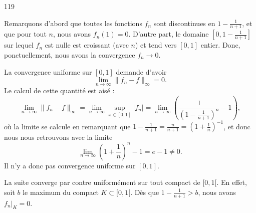 

\begin{corrige}{119}


%

Remarquons d'abord que toutes les fonctions $f_{n}$ sont discontinues en $1-\frac{1}{ n+1 }$, et que pour tout $n$, nous avons $f_n(1)=0$. D'autre part, le domaine $[0,1-\frac{1}{ n+1 }]$ sur lequel $f_n$ est nulle est croissant (avec $n$) et tend vers $[0,1]$ entier. Donc, ponctuellement, nous avons la convergence $f_n\to 0$.

La convergence uniforme sur $[0,1]$ demande d'avoir
\begin{equation}
	\lim_{n\to\infty}\| f_n-f \|_{\infty}=0.
\end{equation}
Le calcul de cette quantité est aisé :
\begin{equation}
	\lim_{n\to\infty}\| f_n-f \|_{\infty}=\lim_{n\to\infty}\sup_{x\in[0,1]}| f_n |=\lim_{n\to\infty}\left( \frac{1}{ \left( 1-\frac{ 1 }{ n+1 } \right)^n }-1 \right),
\end{equation}
où la limite se calcule en remarquant que $1-\frac{ 1 }{ n+1 }=\frac{ n }{ n+1 }=\left( 1+\frac{ 1 }{ n }\right)^{-1}$, et donc nous nous retrouvons avec la limite
\begin{equation}
	\lim_{n\to\infty}\left( 1+\frac{1}{ n } \right)^n-1=e-1\neq 0.
\end{equation}
Il n'y a donc pas convergence uniforme sur $[0,1]$.

La suite converge par contre uniformément sur tout compact de $[0,1[$. En effet, soit $b$ le maximum du compact $K\subset[0,1[$. Dès que $1-\frac{ 1 }{ n+1 }>b$, nous avons $f_{n}|_{K}=0$.

\end{corrige}
